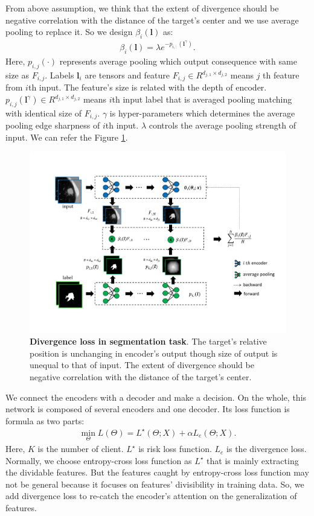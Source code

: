 \documentclass[journal]{IEEEtran}
\begin{document}
From above assumption, we think that the extent of divergence should be negative correlation with the distance of the target's center and we use average pooling to replace it. So we design $\beta_{i}(\boldsymbol{l})$ as:
\begin{align}\nonumber
	\beta_{i}(\boldsymbol{l})=\lambda e^{-p_{i,:}(\boldsymbol{l}^{\gamma })} .
\end{align}
Here, $p_{i,j}(\cdot)$ represents average pooling which output consequence with same size as $F_{i,j}$. Labels $\boldsymbol{l}_{i}$ are tensors and feature $F_{i,j}\in R^{d_{j,1}\times d_{j,2}} $ means $j$ th feature from $i$th input. The feature's size is related with the depth of encoder. $p_{i,j}(\boldsymbol{l}^{\gamma}) \in R^{d_{j,1}\times d_{j,2}}$ means $i$th input label that is averaged pooling matching with identical size of  $F_{i,j}$. $\gamma$ is hyper-parameters which determines the average pooling edge sharpness of $i$th input. $\lambda$ controls the average pooling strength of input. We can refer the Figure \ref{fig:segmentation_encoder_backward}.
\begin{figure}
	\centering
	\includegraphics[scale=0.25]{./picture/seg_encoder_back.pdf}
	\caption{\textbf{Divergence loss in segmentation task}. The target's relative position is unchanging in encoder's output though size of output is unequal to that of input. The extent of divergence should be negative correlation with the distance of the target's center.}
	\label{fig:segmentation_encoder_backward}
\end{figure}


We connect the encoders with a decoder and make a decision. On the whole, this network is composed of several encoders and one decoder. Its loss function is formula as two parts:
\begin{align}\label{whole_loss}
	\min\limits_{\Theta} L(\Theta)=L^{\star}(\Theta;X)+\alpha L_{e}(\Theta;X) .
\end{align}
Here, $K$ is the number of client. $L^{\star}$ is risk loss function. $L_{e}$ is the divergence loss. Normally, we choose entropy-cross loss function as $L^{\star}$ that is mainly extracting the dividable features. But the features caught by entropy-cross loss function may not be general because it focuses on features' divisibility in training data. So, we add divergence loss to re-catch the encoder's attention on the generalization of features.
\end{document}
